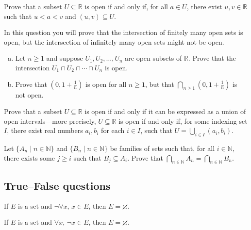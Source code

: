 \begin{chapex}
Prove that a subset $U \subseteq \mathbb{R}$ is open if and only if, for all $a \in U$, there exist $u,v \in \mathbb{R}$ such that $u<a<v$ and $(u,v) \subseteq U$.
\end{chapex}

\begin{chapex}
In this question you will prove that the intersection of finitely many open sets is open, but the intersection of infinitely many open sets might not be open.
\begin{enumerate}[(a)]
\item Let $n \ge 1$ and suppose $U_1, U_2, \dots, U_n$ are open subsets of $\mathbb{R}$. Prove that the intersection $U_1 \cap U_2 \cap \cdots \cap U_n$ is open.
\item Prove that $(0,1+\frac{1}{n})$ is open for all $n \ge 1$, but that $\bigcap_{n \ge 1} (0,1+\textstyle\frac{1}{n})$ is not open.
\end{enumerate}
\end{chapex}

\begin{chapex}
\label{cqOpenSubsetsOfREnd}
Prove that a subset $U \subseteq \mathbb{R}$ is open if and only if it can be expressed as a union of open intervals---more precisely, $U \subseteq \mathbb{R}$ is open if and only if, for some indexing set $I$, there exist real numbers $a_i, b_i$ for each $i \in I$, such that $U = \bigcup_{i \in I} (a_i, b_i)$.
\end{chapex}

\begin{chapex}
Let $\{ A_n \mid n \in \mathbb{N} \}$ and $\{ B_n \mid n \in \mathbb{N} \}$ be families of sets such that, for all $i \in \mathbb{N}$, there exists some $j \ge i$ such that $B_j \subseteq A_i$. Prove that $\bigcap_{n \in \mathbb{N}} A_n = \bigcap_{n \in \mathbb{N}} B_n$.
\end{chapex}

\subsection*{True--False questions}


\begin{chapex}
\label{cqSetsTFBegin}
If $E$ is a set and $\neg \forall x,\, x \in E$, then $E = \varnothing$.
\end{chapex}

\begin{chapex}
If $E$ is a set and $\forall x,\, \neg x \in E$, then $E = \varnothing$.
\end{chapex}

